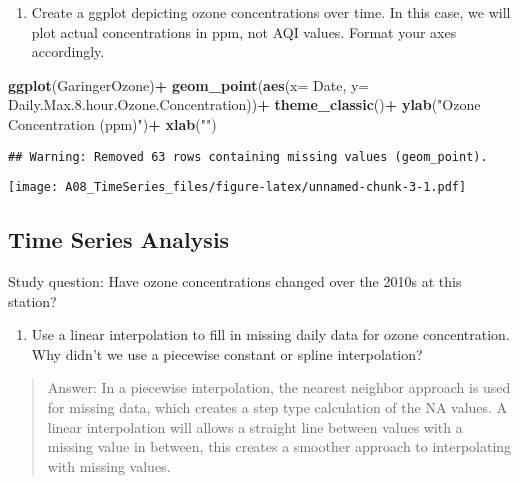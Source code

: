 \documentclass[]{article}
\newenvironment{Shaded}{\begin{snugshade}}{\end{snugshade}}
\newcommand{\DataTypeTok}[1]{\textcolor[rgb]{0.13,0.29,0.53}{#1}}
\newcommand{\FloatTok}[1]{\textcolor[rgb]{0.00,0.00,0.81}{#1}}
\newcommand{\KeywordTok}[1]{\textcolor[rgb]{0.13,0.29,0.53}{\textbf{#1}}}
\newcommand{\NormalTok}[1]{#1}
\newcommand{\OperatorTok}[1]{\textcolor[rgb]{0.81,0.36,0.00}{\textbf{#1}}}
\newcommand{\StringTok}[1]{\textcolor[rgb]{0.31,0.60,0.02}{#1}}
\providecommand{\tightlist}{%
  \setlength{\itemsep}{0pt}\setlength{\parskip}{0pt}}
\begin{document}
\begin{enumerate}
\def\labelenumi{\arabic{enumi}.}
\setcounter{enumi}{6}
\tightlist
\item
  Create a ggplot depicting ozone concentrations over time. In this
  case, we will plot actual concentrations in ppm, not AQI values.
  Format your axes accordingly.
\end{enumerate}

\begin{Shaded}
\begin{Highlighting}[]
\KeywordTok{ggplot}\NormalTok{(GaringerOzone)}\OperatorTok{+}
\StringTok{  }\KeywordTok{geom_point}\NormalTok{(}\KeywordTok{aes}\NormalTok{(}\DataTypeTok{x=}\NormalTok{ Date, }
                 \DataTypeTok{y=}\NormalTok{ Daily.Max.}\FloatTok{8.}\NormalTok{hour.Ozone.Concentration))}\OperatorTok{+}
\StringTok{  }\KeywordTok{theme_classic}\NormalTok{()}\OperatorTok{+}
\StringTok{  }\KeywordTok{ylab}\NormalTok{(}\StringTok{"Ozone Concentration (ppm)"}\NormalTok{)}\OperatorTok{+}
\StringTok{  }\KeywordTok{xlab}\NormalTok{(}\StringTok{""}\NormalTok{)}
\end{Highlighting}
\end{Shaded}

\begin{verbatim}
## Warning: Removed 63 rows containing missing values (geom_point).
\end{verbatim}

\texttt{[image: A08\_TimeSeries\_files/figure-latex/unnamed-chunk-3-1.pdf]}

\hypertarget{time-series-analysis}{%
\subsection{Time Series Analysis}\label{time-series-analysis}}

Study question: Have ozone concentrations changed over the 2010s at this
station?

\begin{enumerate}
\def\labelenumi{\arabic{enumi}.}
\setcounter{enumi}{7}
\tightlist
\item
  Use a linear interpolation to fill in missing daily data for ozone
  concentration. Why didn't we use a piecewise constant or spline
  interpolation?
\end{enumerate}

\begin{quote}
Answer: In a piecewise interpolation, the nearest neighbor approach is
used for missing data, which creates a step type calculation of the NA
values. A linear interpolation will allows a straight line between
values with a missing value in between, this creates a smoother approach
to interpolating with missing values.
\end{quote}
\end{document}
